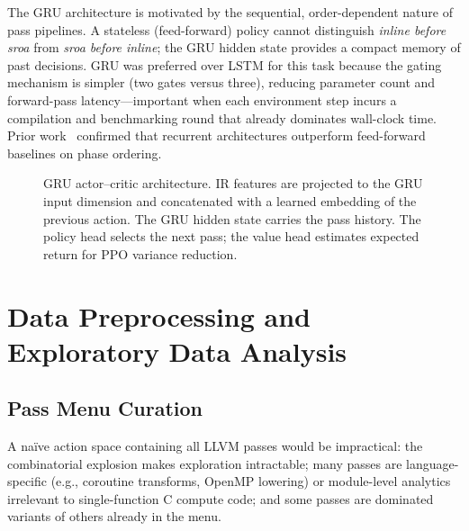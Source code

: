 \documentclass[conference]{IEEEtran}
\begin{document}
The GRU architecture is motivated by the sequential, order-dependent nature of
pass pipelines.  A stateless (feed-forward) policy cannot distinguish
\emph{inline before sroa} from \emph{sroa before inline}; the GRU hidden state
provides a compact memory of past decisions.  GRU was preferred over LSTM for
this task because the gating mechanism is simpler (two gates versus three),
reducing parameter count and forward-pass latency---important when each
environment step incurs a compilation and benchmarking round that already
dominates wall-clock time.  Prior work~\cite{huang2019autophase} confirmed that
recurrent architectures outperform feed-forward baselines on phase ordering.

\begin{figure}[t]
  \centering
  \caption{GRU actor--critic architecture.  IR features are projected to the
    GRU input dimension and concatenated with a learned embedding of the
    previous action.  The GRU hidden state carries the pass history.  The
    policy head selects the next pass; the value head estimates expected return
    for PPO variance reduction.}
  \label{fig:arch}
\end{figure}

\section{Data Preprocessing and Exploratory Data Analysis}

\subsection{Pass Menu Curation}

A na\"ive action space containing all LLVM passes would be impractical: the
combinatorial explosion makes exploration intractable; many passes are
language-specific (e.g., coroutine transforms, OpenMP lowering) or
module-level analytics irrelevant to single-function C compute code; and some
passes are dominated variants of others already in the menu.
\end{document}
